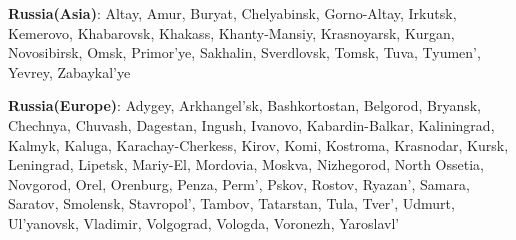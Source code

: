 \item \textbf{Russia(Asia)}: Altay, Amur, Buryat, Chelyabinsk, Gorno-Altay, Irkutsk, Kemerovo, Khabarovsk, Khakass, Khanty-Mansiy, Krasnoyarsk, Kurgan, Novosibirsk, Omsk, Primor'ye, Sakhalin, Sverdlovsk, Tomsk, Tuva, Tyumen', Yevrey, Zabaykal'ye
\item \textbf{Russia(Europe)}: Adygey, Arkhangel'sk, Bashkortostan, Belgorod, Bryansk, Chechnya, Chuvash, Dagestan, Ingush, Ivanovo, Kabardin-Balkar, Kaliningrad, Kalmyk, Kaluga, Karachay-Cherkess, Kirov, Komi, Kostroma, Krasnodar, Kursk, Leningrad, Lipetsk, Mariy-El, Mordovia, Moskva, Nizhegorod, North Ossetia, Novgorod, Orel, Orenburg, Penza, Perm', Pskov, Rostov, Ryazan', Samara, Saratov, Smolensk, Stavropol', Tambov, Tatarstan, Tula, Tver', Udmurt, Ul'yanovsk, Vladimir, Volgograd, Vologda, Voronezh, Yaroslavl'
